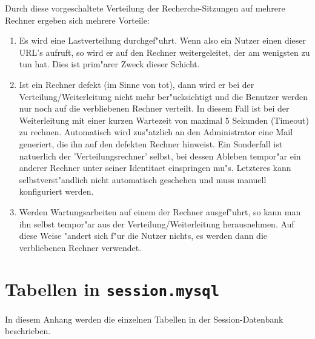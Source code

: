 \documentclass[11pt, twoside, a4paper, BCOR8mm, DIV12, bibtotoc,idxtotoc]{scrbook}
\begin{document}
Durch diese vorgeschaltete Verteilung der Recherche-Sitzungen auf
mehrere Rechner ergeben sich mehrere Vorteile:

\begin{enumerate}
\item Es wird eine Lastverteilung durchgef"uhrt. Wenn also ein Nutzer
  einen dieser URL's aufruft, so wird er auf den Rechner
  weitergeleitet, der am wenigsten zu tun hat.  Dies ist prim"arer
  Zweck dieser Schicht.
\item Ist ein Rechner defekt (im Sinne von tot), dann wird er bei der
  Verteilung/Weiterleitung nicht mehr ber"ucksichtigt und die Benutzer
  werden nur noch auf die verbliebenen Rechner verteilt. In diesem
  Fall ist bei der Weiterleitung mit einer kurzen Wartezeit von
  maximal 5 Sekunden (Timeout) zu rechnen.  Automatisch wird
  zus"atzlich an den Administrator eine Mail ge\-ne\-riert, die ihn
  auf den defekten Rechner hinweist. Ein Sonderfall ist natuerlich der
  'Verteilungs\-rech\-ner' selbst, bei dessen Ableben tempor"ar ein
  anderer Rechner unter seiner Identitaet einspringen mu"s. Letzteres
  kann selbstverst"andlich nicht automatisch geschehen und muss
  manuell konfiguriert werden.
\item Werden Wartungsarbeiten auf einem der Rechner ausgef"uhrt, so
  kann man ihn selbst tempor"ar aus der Verteilung/Weiterleitung
  herausnehmen. Auf diese Weise "andert sich f"ur die Nutzer nichts,
  es werden dann die verbliebenen Rechner verwendet.
\end{enumerate}

\appendix

\chapter{Tabellen in \texttt{session.mysql}}

In diesem Anhang werden die einzelnen Tabellen in der
Session-Datenbank beschrieben.
\end{document}
